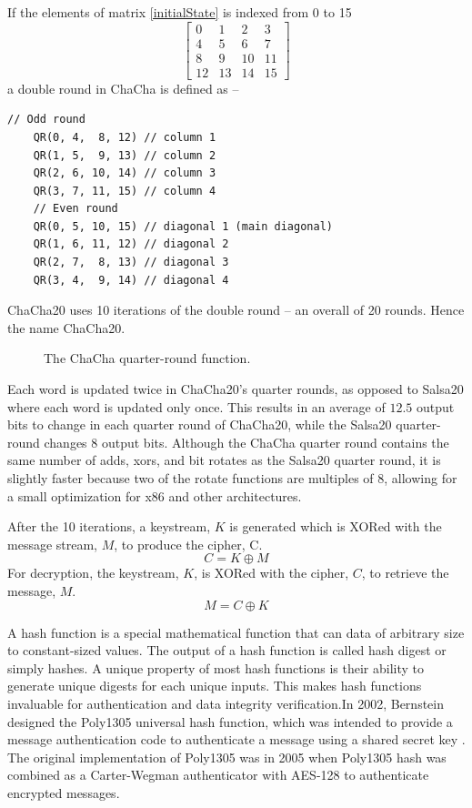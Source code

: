 \documentclass[a4paper]{cas-sc}
\begin{document}
\noindent If the elements of matrix \ref{initialState} is indexed from 0 to 15
\[\left[
        \begin{array}{cccc}
            0  & 1  & 2  & 3  \\
            4  & 5  & 6  & 7  \\
            8  & 9  & 10 & 11 \\
            12 & 13 & 14 & 15
        \end{array}
        \right]\]
a double round in ChaCha is defined as --
\begin{lstlisting}[basicstyle=\ttfamily,frame=none]
    // Odd round
    QR(0, 4,  8, 12) // column 1
    QR(1, 5,  9, 13) // column 2
    QR(2, 6, 10, 14) // column 3
    QR(3, 7, 11, 15) // column 4
    // Even round
    QR(0, 5, 10, 15) // diagonal 1 (main diagonal)
    QR(1, 6, 11, 12) // diagonal 2
    QR(2, 7,  8, 13) // diagonal 3
    QR(3, 4,  9, 14) // diagonal 4
\end{lstlisting}
ChaCha20 uses 10 iterations of the double round -- an overall of 20 rounds. Hence the name ChaCha20.

\begin{figure}[pos=h]
    \centering
    
    \caption{The ChaCha quarter-round function.}
\end{figure}

Each word is updated twice in ChaCha20's quarter rounds, as opposed to Salsa20 where each word is updated only once. This results in an average of $12.5$ output bits to change in each quarter round of ChaCha20, while the Salsa20 quarter-round changes 8 output bits. Although the ChaCha quarter round contains the same number of adds, xors, and bit rotates as the Salsa20 quarter round, it is slightly faster because two of the rotate functions are multiples of 8, allowing for a small optimization for x86 and other architectures.

After the 10 iterations, a keystream, $K$ is generated which is XORed with the message stream, $M$, to produce the cipher, C.
\[C = K \oplus M\]
For decryption, the keystream, $K$, is XORed with the cipher, $C$, to retrieve the message, $M$.
\[M = C \oplus K\]


A hash function is a special mathematical function that can data of arbitrary size to constant-sized values. The output of a hash function is called hash digest or simply hashes. A unique property of most hash functions is their ability to generate unique digests for each unique inputs. This makes hash functions invaluable for authentication and data integrity verification.In 2002, Bernstein designed the Poly1305 universal hash function, which was intended to provide a message authentication code to authenticate a message using a shared secret key \cite{bernstein2005protecting}. The original implementation of Poly1305 was in 2005 when Poly1305 hash was combined as a Carter-Wegman authenticator \cite{carter1981new} with AES-128 to authenticate encrypted messages.
\end{document}
